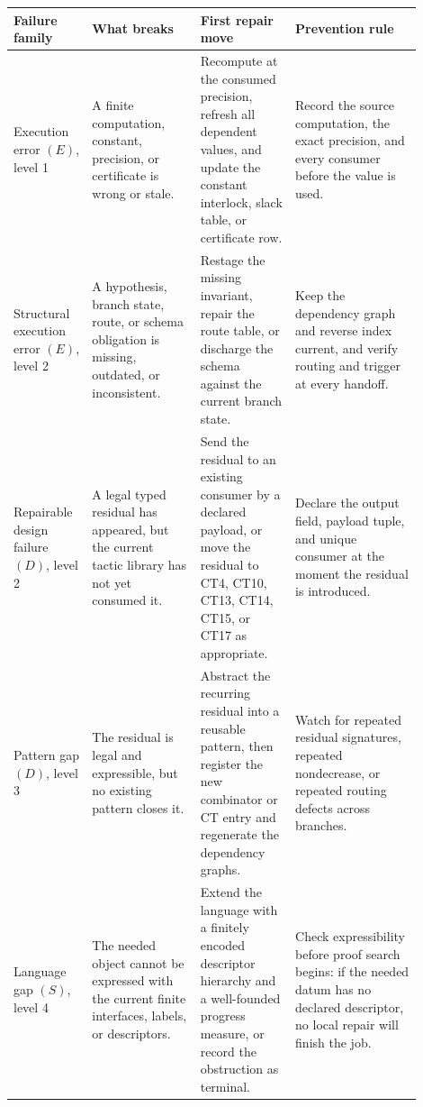 \documentclass[
  11pt,
]{article}
\theoremstyle{definition}
\begin{document}
\begin{longtable}[]{@{}
  >{\raggedright\arraybackslash}p{0.16\linewidth}
  >{\raggedright\arraybackslash}p{0.24\linewidth}
  >{\raggedright\arraybackslash}p{0.21\linewidth}
  >{\raggedright\arraybackslash}p{0.29\linewidth}@{}}
\toprule\noalign{}
Failure family & What breaks & First repair move & Prevention rule \\
\midrule\noalign{}
\endhead
\bottomrule\noalign{}
\endlastfoot
Execution error \((E)\), level 1 & A finite computation, constant, precision, or certificate is wrong or stale. & Recompute at the consumed precision, refresh all dependent values, and update the constant interlock, slack table, or certificate row. & Record the source computation, the exact precision, and every consumer before the value is used. \\
Structural execution error \((E)\), level 2 & A hypothesis, branch state, route, or schema obligation is missing, outdated, or inconsistent. & Restage the missing invariant, repair the route table, or discharge the schema against the current branch state. & Keep the dependency graph and reverse index current, and verify routing and trigger at every handoff. \\
Repairable design failure \((D)\), level 2 & A legal typed residual has appeared, but the current tactic library has not yet consumed it. & Send the residual to an existing consumer by a declared payload, or move the residual to CT4, CT10, CT13, CT14, CT15, or CT17 as appropriate. & Declare the output field, payload tuple, and unique consumer at the moment the residual is introduced. \\
Pattern gap \((D)\), level 3 & The residual is legal and expressible, but no existing pattern closes it. & Abstract the recurring residual into a reusable pattern, then register the new combinator or CT entry and regenerate the dependency graphs. & Watch for repeated residual signatures, repeated nondecrease, or repeated routing defects across branches. \\
Language gap \((S)\), level 4 & The needed object cannot be expressed with the current finite interfaces, labels, or descriptors. & Extend the language with a finitely encoded descriptor hierarchy and a well-founded progress measure, or record the obstruction as terminal. & Check expressibility before proof search begins: if the needed datum has no declared descriptor, no local repair will finish the job. \\
\end{longtable}
\end{document}
